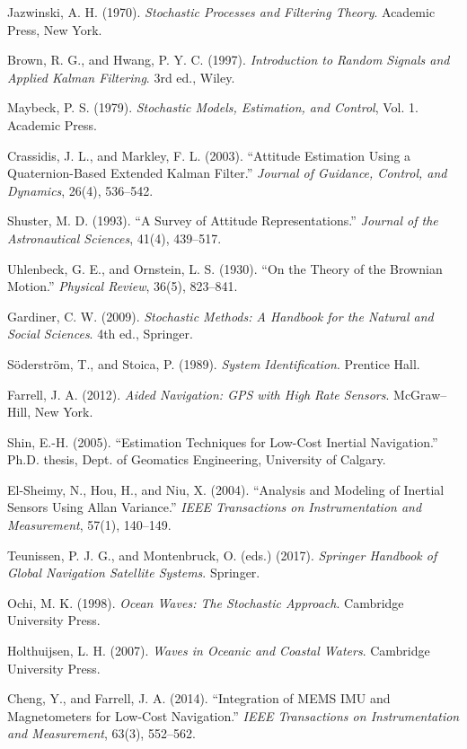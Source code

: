 \documentclass[10pt]{extarticle}
\begin{document}
\begin{thebibliography}{99}

Jazwinski, A. H. (1970).  
\emph{Stochastic Processes and Filtering Theory}.  
Academic Press, New York.

Brown, R. G., and Hwang, P. Y. C. (1997).  
\emph{Introduction to Random Signals and Applied Kalman Filtering}.  
3rd ed., Wiley.

Maybeck, P. S. (1979).  
\emph{Stochastic Models, Estimation, and Control}, Vol. 1.  
Academic Press.

Crassidis, J. L., and Markley, F. L. (2003).  
“Attitude Estimation Using a Quaternion-Based Extended Kalman Filter.”  
\emph{Journal of Guidance, Control, and Dynamics}, 26(4), 536–542.

Shuster, M. D. (1993).  
“A Survey of Attitude Representations.”  
\emph{Journal of the Astronautical Sciences}, 41(4), 439–517.

Uhlenbeck, G. E., and Ornstein, L. S. (1930).  
“On the Theory of the Brownian Motion.”  
\emph{Physical Review}, 36(5), 823–841.

Gardiner, C. W. (2009).  
\emph{Stochastic Methods: A Handbook for the Natural and Social Sciences}.  
4th ed., Springer.

S{\"o}derstr{\"o}m, T., and Stoica, P. (1989).  
\emph{System Identification}.  
Prentice Hall.

Farrell, J. A. (2012).  
\emph{Aided Navigation: GPS with High Rate Sensors}.  
McGraw–Hill, New York.

Shin, E.-H. (2005).  
“Estimation Techniques for Low-Cost Inertial Navigation.”  
Ph.D. thesis, Dept. of Geomatics Engineering, University of Calgary.

El-Sheimy, N., Hou, H., and Niu, X. (2004).  
“Analysis and Modeling of Inertial Sensors Using Allan Variance.”  
\emph{IEEE Transactions on Instrumentation and Measurement}, 57(1), 140–149.

Teunissen, P. J. G., and Montenbruck, O. (eds.) (2017).  
\emph{Springer Handbook of Global Navigation Satellite Systems}.  
Springer.

Ochi, M. K. (1998).  
\emph{Ocean Waves: The Stochastic Approach}.  
Cambridge University Press.

Holthuijsen, L. H. (2007).  
\emph{Waves in Oceanic and Coastal Waters}.  
Cambridge University Press.

Cheng, Y., and Farrell, J. A. (2014).  
“Integration of MEMS IMU and Magnetometers for Low-Cost Navigation.”  
\emph{IEEE Transactions on Instrumentation and Measurement}, 63(3), 552–562.

\end{thebibliography}
\end{document}

